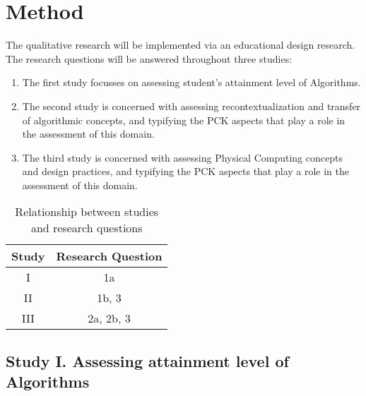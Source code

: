 \section{Method}\label{sec:method}

The qualitative research will be implemented via an educational design research. The research questions will be answered throughout three studies:
\begin{enumerate}[label=\Roman*.]
\item The first study focusses on assessing student's attainment level of Algorithms. %



\item The second study is concerned with assessing recontextualization and transfer of algorithmic concepts, and typifying the PCK aspects that play a role in the assessment of this domain.

\item The third study is concerned with assessing Physical Computing concepts and design practices, and typifying the PCK aspects that play a role in the assessment of this domain.
\end{enumerate}



\begin{table*}
  \centering
\begin{tabular}{|c|c|}
  \hline
  \textbf{Study} & \textbf{Research Question}  \\
  \hline
    I & 1a \\ \hline
    II & 1b, 3 \\ \hline
    III & 2a, 2b, 3 \\ \hline
\end{tabular}
\caption{Relationship between studies and research questions}\label{table:studiesVsQues}
\end{table*}


\subsection{Study I. Assessing attainment level of Algorithms}



